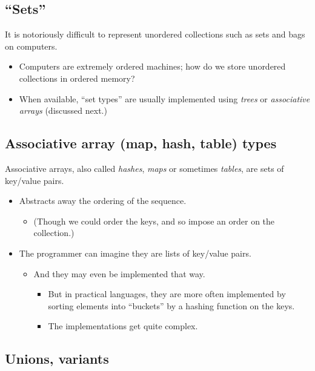 \documentclass[11pt]{article}
\theoremstyle{definition}
\begin{document}
\subsection{“Sets”}
\label{sec:org6391735}

It is notoriously difficult to represent unordered collections
such as sets and bags on computers.
\begin{itemize}
\item Computers are extremely ordered machines; how do we store
unordered collections in ordered memory?
\item When available, “set types” are usually implemented
using \emph{trees} or \emph{associative arrays} (discussed next.)
\end{itemize}

\subsection{Associative array (map, hash, table) types}
\label{sec:org3b2a863}

Associative arrays, also called \emph{hashes}, \emph{maps} or sometimes \emph{tables},
are sets of key/value pairs.
\begin{itemize}
\item Abstracts away the ordering of the sequence.
\begin{itemize}
\item (Though we could order the keys, and so impose
an order on the collection.)
\end{itemize}
\item The programmer can imagine they are lists of key/value pairs.
\begin{itemize}
\item And they may even be implemented that way.
\begin{itemize}
\item But in practical languages, they are more often
implemented by sorting elements into “buckets”
by a hashing function on the keys.
\item The implementations get quite complex.
\end{itemize}
\end{itemize}
\end{itemize}

\subsection{Unions, variants}
\label{sec:orgc684de5}
\end{document}
